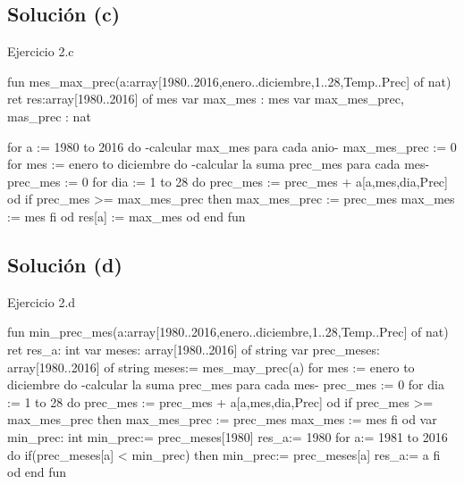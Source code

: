 \subsection{Solución (c)}
\begin{codebox}{Ejercicio 2.c}
\begin{pascallike}
fun mes_max_prec(a:array[1980..2016,enero..diciembre,1..28,Temp..Prec] of nat)
    ret res:array[1980..2016] of mes
var max_mes : mes
var max_mes_prec, mas_prec : nat

for a := 1980 to 2016 do
    {-calcular max_mes para cada anio-}
    max_mes_prec := 0
    for mes := enero to diciembre do
        {-calcular la suma prec_mes para cada mes-}
        prec_mes := 0
        for dia := 1 to 28 do
            prec_mes := prec_mes + a[a,mes,dia,Prec]
        od
        if prec_mes >= max_mes_prec then
            max_mes_prec := prec_mes
            max_mes := mes
        fi
    od
    res[a] := max_mes
od
end fun
\end{pascallike}
\end{codebox}

\subsection{Solución (d)}
\begin{codebox}{Ejercicio 2.d}
\begin{pascallike}
fun min_prec_mes(a:array[1980..2016,enero..diciembre,1..28,Temp..Prec] of nat)
ret res_a: int
var meses: array[1980..2016] of string
var prec_meses: array[1980..2016] of string
meses:= mes_may_prec(a)
for mes := enero to diciembre do
        {-calcular la suma prec_mes para cada mes-}
        prec_mes := 0
        for dia := 1 to 28 do
            prec_mes := prec_mes + a[a,mes,dia,Prec]
        od
        if prec_mes >= max_mes_prec then
            max_mes_prec := prec_mes
            max_mes := mes
        fi
    od
var min_prec: int
min_prec:= prec_meses[1980]
res_a:= 1980
for a:= 1981 to 2016 do
    if(prec_meses[a] < min_prec) then
        min_prec:= prec_meses[a]
        res_a:= a
    fi
od
end fun
\end{pascallike}
\end{codebox}


